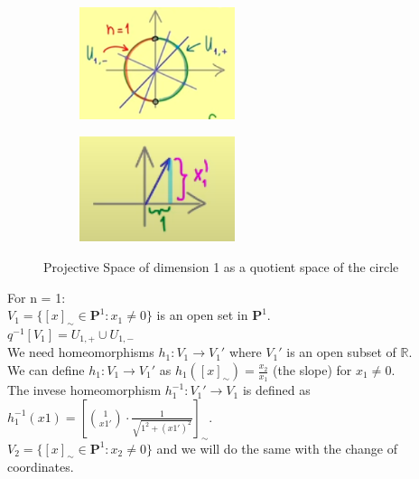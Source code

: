 \documentclass[11pt]{book} %
\begin{document}
\begin{figure}[H]
    \begin{subfigure}{0.5\textwidth}
        \centering
        \includegraphics[width=0.5\textwidth]{Figs/projective_space_P1.png}
    \end{subfigure}
    \begin{subfigure}{0.5\textwidth}
        \centering
        \includegraphics[width=0.5\textwidth]{Figs/projective_space_P1_2.png}
    \end{subfigure}
    \caption{Projective Space of dimension 1 as a quotient space of the circle}
\end{figure}

For n = 1: \\
\( V_1 = \{ [x]_\sim \in \mathbf{P}^1 : x_1 \neq 0 \} \) is an open set in \( \mathbf{P}^1 \). \\
\( q^{-1}[V_1] = U_{1, +} \cup U_{1, -} \) \\
We need homeomorphisms \( h_1: V_1 \to V_1' \) where \( V_1' \) is an open subset of \( \mathbb{R} \). \\
We can define \( h_1: V_1 \to V_1' \) as \( h_1([x]_\sim) = \frac{x_2}{x_1} \) (the slope) for \( x_1 \neq 0 \). \\
The invese homeomorphism \( h_1^{-1}: V_1' \to V_1 \) is defined as \( h_1^{-1}(x1) = [ \binom{1}{x1'} \cdot \frac{1}{\sqrt{1^2 + ({x1'})^2}} ]_\sim \). \\
\( V_2 = \{ [x]_\sim \in \mathbf{P}^1 : x_2 \neq 0 \} \) and we will do the same with the change of coordinates.

\medbreak
\end{document}
